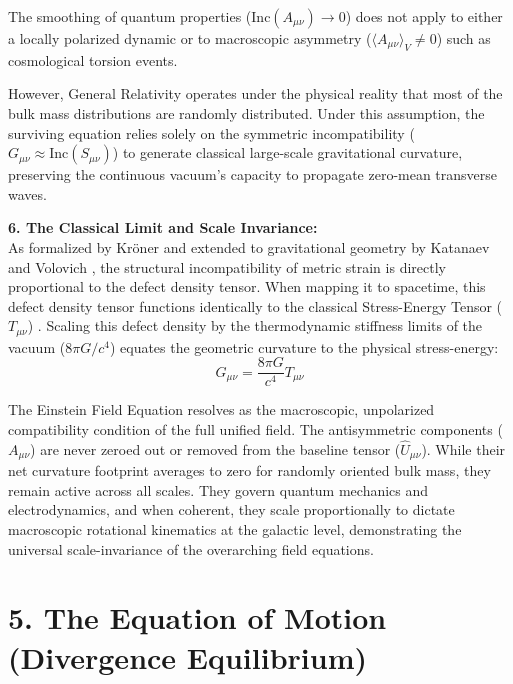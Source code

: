The smoothing of quantum properties ($\text{Inc}(A_{\mu\nu}) \to 0$) does not apply to either a locally polarized dynamic or to macroscopic asymmetry ($\langle A_{\mu\nu} \rangle_V \neq 0$) such as cosmological torsion events. 

However, General Relativity operates under the physical reality that most of the bulk mass distributions are randomly distributed.  Under this assumption, the surviving equation relies solely on the symmetric incompatibility ($G_{\mu\nu} \approx \text{Inc}(S_{\mu\nu})$) to generate classical large-scale gravitational curvature, preserving the continuous vacuum's capacity to propagate zero-mean transverse waves. 

\vspace{0.2 cm}

\textbf{6. The Classical Limit and Scale Invariance:} \\
As formalized by Kr\"{o}ner and extended to gravitational geometry by Katanaev and Volovich \cite{katanaev1992theory}, the structural incompatibility of metric strain is directly proportional to the defect density tensor. When mapping it to spacetime, this defect density tensor functions identically to the classical Stress-Energy Tensor ($T_{\mu\nu}$) \cite{kleinert2008multivalued}. Scaling this defect density by the thermodynamic stiffness limits of the vacuum ($8\pi G / c^4$) equates the geometric curvature to the physical stress-energy:
\begin{equation}
    G_{\mu\nu} = \frac{8\pi G}{c^4} T_{\mu\nu} \label{eq:einstein_field_equation}
\end{equation}

The Einstein Field Equation resolves as the macroscopic, unpolarized compatibility condition of the full unified field. The antisymmetric components ($A_{\mu\nu}$) are never zeroed out or removed from the baseline tensor ($\hat{U}_{\mu\nu}$). While their net curvature footprint averages to zero for randomly oriented bulk mass, they remain active across all scales. They govern quantum mechanics and electrodynamics, and when coherent, they scale proportionally to dictate macroscopic rotational kinematics at the galactic level, demonstrating the universal scale-invariance of the overarching field equations.







\section*{5. The Equation of Motion (Divergence Equilibrium)}

